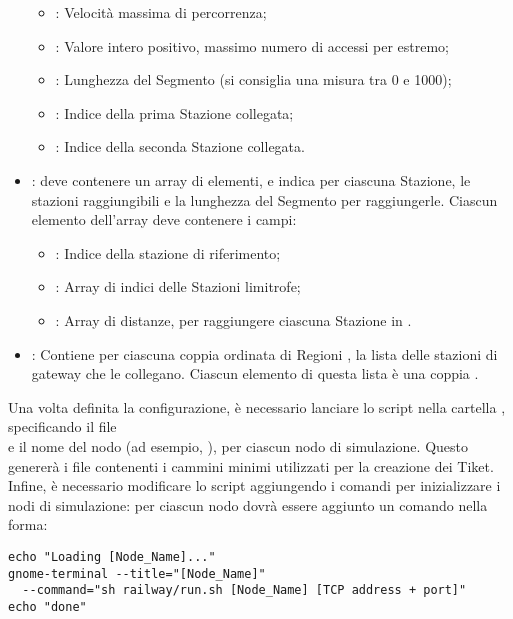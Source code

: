 \begin{itemize}
\begin{itemize}
				\item {}: Velocità massima di percorrenza;
				\item {}: Valore intero positivo, massimo numero di accessi per estremo;
				\item {}: Lunghezza del Segmento (si consiglia una misura tra 0 e 1000);
				\item {}: Indice della prima Stazione collegata;
				\item {}: Indice della seconda Stazione collegata.
			\end{itemize}
		\item {}: deve contenere un array  di elementi, e indica per ciascuna Stazione, le stazioni raggiungibili e la lunghezza del Segmento per raggiungerle. Ciascun elemento dell'array deve contenere i campi:
			\begin{itemize}
				\item {}: Indice della stazione di riferimento;
				\item {}: Array di indici delle Stazioni limitrofe;
				\item {}: Array di distanze, per raggiungere ciascuna Stazione in .
			\end{itemize}
		\item {}: Contiene per ciascuna coppia ordinata di Regioni , la lista delle stazioni di gateway che le collegano. Ciascun elemento di questa lista è una coppia . 
	\end{itemize}
	
	Una volta definita la configurazione, è necessario lanciare lo script  nella cartella , specificando il file \\ e il nome del nodo (ad esempio, ), per ciascun nodo di simulazione. Questo genererà i file  contenenti i cammini minimi utilizzati per la creazione dei Tiket.
	Infine, è necessario modificare lo script  aggiungendo i comandi per inizializzare i nodi di simulazione: per ciascun nodo dovrà essere aggiunto un comando nella forma:
	\begin{verbatim}
echo "Loading [Node_Name]..."
gnome-terminal --title="[Node_Name]"
  --command="sh railway/run.sh [Node_Name] [TCP address + port]"
echo "done"
	\end{verbatim}
	
